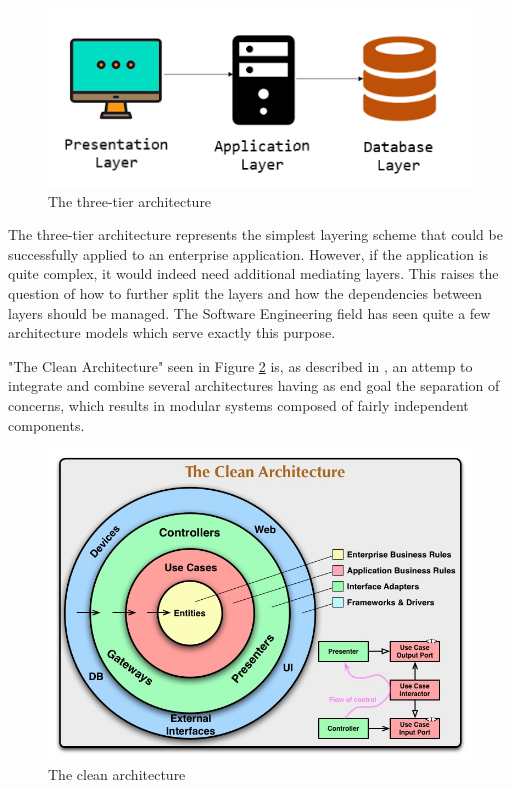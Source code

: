 \begin{figure}[H]
    \centering
    \includegraphics[width=5in]{images/threeTierArchitecture}
    \caption{The three-tier architecture \cite{threeTierArchitecture}}
    \label{threeTierArchitecture}
\end{figure}

The three-tier architecture represents the simplest layering scheme that could be successfully applied to an enterprise application. However, if the application is quite complex, it would indeed need additional mediating layers. This raises the question of how to further split the layers and how the dependencies between layers should be managed. The Software Engineering field has seen quite a few architecture models which serve exactly this purpose.

"The Clean Architecture" seen in Figure \ref{cleanArchitectureImg} is, as described in \cite{cleanArchitecture}, an attemp to integrate and combine several architectures having as end goal the separation of concerns, which results in modular systems composed of fairly independent components.

\begin{figure}[H]
    \centering
    \includegraphics[width=6in]{images/cleanArchitecture}
    \caption{The clean architecture \cite{cleanArchitecture}}
    \label{cleanArchitectureImg}
\end{figure}

